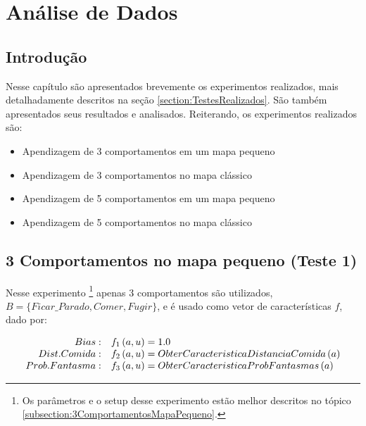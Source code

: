 


\chapter{Análise de Dados} \label{chap:Resultados}



\section{Introdução}

Nesse capítulo são apresentados brevemente os experimentos realizados, mais detalhadamente descritos na seção \ref{section:TestesRealizados}. São também apresentados seus resultados e analisados. Reiterando, os experimentos realizados são:

\begin{itemize}
	\item Apendizagem de 3 comportamentos em um mapa pequeno
	\item Apendizagem de 3 comportamentos no mapa clássico
	\item Apendizagem de 5 comportamentos em um mapa pequeno
	\item Apendizagem de 5 comportamentos no mapa clássico
\end{itemize}

\section{3 Comportamentos no mapa pequeno (Teste 1)}

Nesse experimento%
\footnote{Os parâmetros e o setup desse experimento estão melhor descritos no tópico \ref{subsection:3ComportamentosMapaPequeno}.%
} apenas 3 comportamentos são utilizados, $ B = \{Ficar\_Parado,\allowbreak Comer,\allowbreak Fugir\} $, e é usado como vetor de características $ f $, dado por:

\begin{equation}
	\begin{array}{r l}
		Bias: & f_1 \left( a, u \right) = 1.0 \\
		Dist. Comida: & f_2 \left( a, u \right) = ObterCaracteristicaDistanciaComida \left( a \right) \\
		Prob. Fantasma: & f_3 \left( a, u \right) = ObterCaracteristicaProbFantasmas \left( a \right)
	\end{array}
\end{equation}

